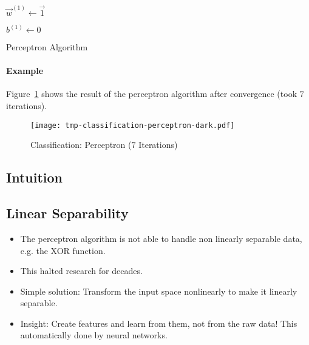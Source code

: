 		\begin{algorithm}
			\( \vec{w}^{(1)} \gets \vec{1} \)

			\( b^{(1)} \gets 0 \)


			\caption{Perceptron Algorithm}
			\label{alg:perceptron}
		\end{algorithm}

		\paragraph{Example}
			Figure~\ref{fig:perceptronExample} shows the result of the perceptron algorithm after convergence (took \(7\) iterations).

			\begin{figure}
				\centering
				\texttt{[image: tmp-classification-perceptron-dark.pdf]}
				\caption{Classification: Perceptron (\(7\) Iterations)}
				\label{fig:perceptronExample}
			\end{figure}

		\subsection{Intuition} %

		\subsection{Linear Separability}
			\begin{itemize}
				\item The perceptron algorithm is not able to handle non linearly separable data, e.g. the XOR function.
				\item This halted research for decades.
				\item Simple solution: Transform the input space nonlinearly to make it linearly separable.
				\item Insight: Create features and learn from them, not from the raw data! This automatically done by neural networks.
			\end{itemize}

